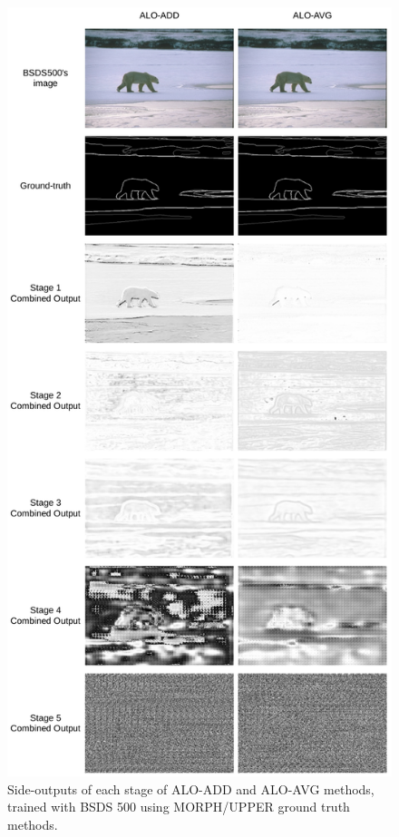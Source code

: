 \begin{figure}%
  \centering
  \includegraphics[width=0.9\columnwidth]{../imagens/ilustracoes/cap6_bsds_stage_outputs.png}
  \caption{Side-outputs of each stage of ALO-ADD and ALO-AVG methods, trained with BSDS 500 using MORPH/UPPER ground truth methods.}
  \label{fig:bsds_stage_outputs}
\end{figure}

